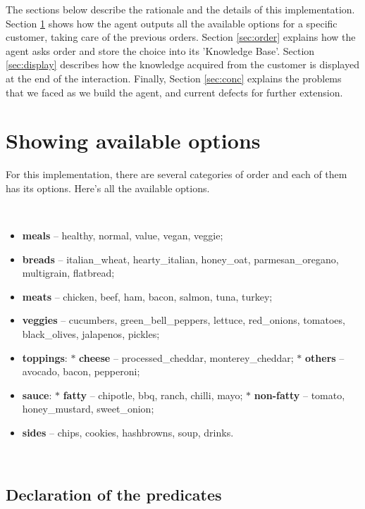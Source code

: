 \documentclass[12pt,a4paper]{article}
\begin{document}
The sections below describe the rationale and the details of this implementation. Section \ref{sec:option} shows how the agent outputs all the available options for a specific customer, taking care of the previous orders. Section \ref{sec:order} explains how the agent asks order and store the choice into its 'Knowledge Base'. Section \ref{sec:display} describes how the knowledge acquired from the customer is displayed at the end of the interaction. Finally, Section \ref{sec:conc} explains the problems that we faced as we build the agent, and current defects for further extension.\\ 


\newpage
\section{Showing available options}
\label{sec:option}

For this implementation, there are several categories of order and each of them has its options. Here's all the available options.

\ \\ 
\begin{itemize}
    \item \textbf{meals} -- healthy, normal, value, vegan, veggie;
    \item \textbf{breads} -- italian\_wheat, hearty\_italian, honey\_oat, parmesan\_oregano, multigrain, flatbread;
    \item \textbf{meats} -- chicken, beef, ham, bacon, salmon, tuna, turkey;
    \item \textbf{veggies} -- cucumbers, green\_bell\_peppers, lettuce, red\_onions, tomatoes, black\_olives, jalapenos, pickles;
    \item \textbf{toppings}:
        \subitem $*$ \textbf{cheese} -- processed\_cheddar, monterey\_cheddar;
        \subitem $*$ \textbf{others} -- avocado, bacon, pepperoni;
    \item \textbf{sauce}:
        \subitem $*$ \textbf{fatty} -- chipotle, bbq, ranch, chilli, mayo;
        \subitem $*$ \textbf{non-fatty} -- tomato, honey\_mustard, sweet\_onion;
    \item \textbf{sides}     -- chips, cookies, hashbrowns, soup, drinks.
\end{itemize}
\ \\ 


\subsection{Declaration of the predicates}
\end{document}
